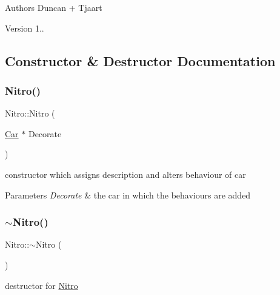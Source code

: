 \begin{DoxyAuthor}{Authors}
Duncan + Tjaart 
\end{DoxyAuthor}
\begin{DoxyVersion}{Version}
1.. 
\end{DoxyVersion}


\subsection{Constructor \& Destructor Documentation}
\mbox{\label{class_nitro_ae686f66dbacbf2a66345d04caa3d67ea}} 
\subsubsection{\texorpdfstring{Nitro()}{Nitro()}\hspace{0.1cm}{\footnotesize\ttfamily [1/2]}}
{\footnotesize\ttfamily Nitro\+::\+Nitro (\begin{DoxyParamCaption}\item[{\mbox{\hyperlink{class_car}{Car}} $\ast$}]{Decorate }\end{DoxyParamCaption})\hspace{0.3cm}{\ttfamily [inline]}}

constructor which assigns description and alters behaviour of car 
\begin{DoxyParams}{Parameters}
{\em Decorate} & the car in which the behaviours are added \\
\hline
\end{DoxyParams}
\mbox{\label{class_nitro_ac64ad126c7af7882afe5e7f67727a889}} 
\subsubsection{\texorpdfstring{$\sim$\+Nitro()}{~Nitro()}}
{\footnotesize\ttfamily Nitro\+::$\sim$\+Nitro (\begin{DoxyParamCaption}{ }\end{DoxyParamCaption})\hspace{0.3cm}{\ttfamily [inline]}}

destructor for \mbox{\hyperlink{class_nitro}{Nitro}} \mbox{\label{class_nitro_a651d03025ee1e2e41e04be171e39b4d4}} 
